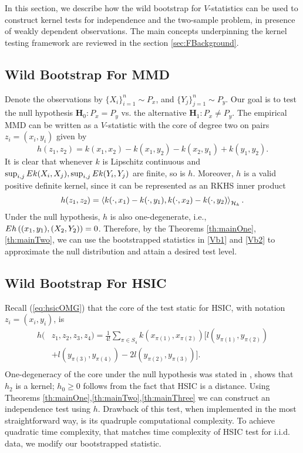 In this section, we describe how the wild bootstrap for $V$-statistics can be used to construct kernel tests for independence and the two-sample problem, in presence of weakly dependent observations. The main concepts underpinning the kernel testing framework are reviewed in the section \ref{sec:FBackground}.

\subsection{Wild Bootstrap For MMD}

Denote the observations by $\{X_i\}_{i=1}^{n}\sim P_x$, and $\{Y_j\}_{j=1}^{n}\sim P_y$. Our goal is to test the null hypothesis $\mathbf H_0: P_x=P_y$ vs. 
the alternative $\mathbf H_1: P_x\neq P_y$. The empirical MMD can be written as a $V$-statistic with the core of degree two on pairs $z_i=(x_i,y_i)$ given by $$h(z_1,z_2) = k(x_1,x_2)- k(x_1,y_2) - k(x_2,y_1) + k(y_1,y_2).$$ 
It is clear that whenever $k$ is Lipschitz continuous and $\sup_{i,j}E k(X_i,X_j), \sup_{i,j}E k(Y_i,Y_j)$ are finite, so is $h$. Moreover, $h$ is a valid positive definite kernel, since it can be represented as an RKHS inner product  
$$h(z_1,z_2) = \left\langle k(\cdot, x_1) -k(\cdot, y_1),k(\cdot, x_2) -k(\cdot, y_2) \right\rangle_{\mathcal{H}_k}.$$
Under the null hypothesis, $h$ is also one-degenerate, i.e., $E h\left((x_1,y_1),(X_2,Y_2)\right) = 0$. Therefore, by the Theorems \ref{th:mainOne}, \ref{th:mainTwo}, we can use the bootstrapped statistics in \eqref{Vb1} and \eqref{Vb2} to approximate the null distribution and attain a desired test level.


\subsection{Wild Bootstrap For HSIC}\label{sec:hsic}

Recall (\ref{eq:hsicOMG}) that the core of the test static for HSIC, with notation $z_i = (x_i,y_i)$, is  
\begin{equation*}
\begin{split}
h(&z_1,z_2,z_3,z_4) = \frac{1}{4!} \sum_{\pi \in S_4}  k(x_{\pi(1)},x_{\pi(2)}) [  l(y_{\pi(1)},y_{\pi(2)})  \\
 &+  l(y_{\pi(3)},y_{\pi(4)}) - 2  l(y_{\pi(2)},y_{\pi(3)})] . \\
\end{split}  
\end{equation*}
One-degeneracy of the core under the null hypothesis was stated in \cite[Theorem 2]{gretton_kernel_2008}, \cite[Section A.2, following eq. (11)]{gretton_kernel_2008} shows that $h_2$ is a kernel; $h_0\geq 0$ follows from the fact that HSIC is a distance. Using Theorems \ref{th:mainOne},\ref{th:mainTwo},\ref{th:mainThree} we can construct an independence test using $h$. Drawback of this test, when implemented in the most straightforward way,  is its quadruple computational complexity. To achieve quadratic time complexity, that matches time complexity of HSIC test for i.i.d. data, we modify our bootstrapped statistic.

